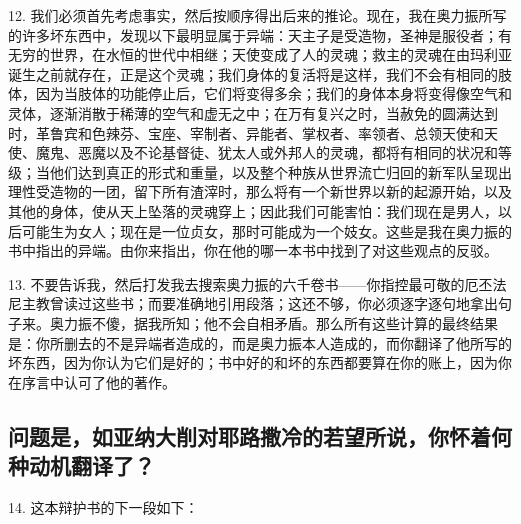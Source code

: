 12. 我们必须首先考虑事实，然后按顺序得出后来的推论。现在，我在奥力振所写的许多坏东西中，发现以下最明显属于异端：天主子是受造物，圣神是服役者；有无穷的世界，在水恒的世代中相继；天使变成了人的灵魂；救主的灵魂在由玛利亚诞生之前就存在，正是这个灵魂；我们身体的复活将是这样，我们不会有相同的肢体，因为当肢体的功能停止后，它们将变得多余；我们的身体本身将变得像空气和灵体，逐渐消散于稀薄的空气和虚无之中；在万有复兴之时，当赦免的圆满达到时，革鲁宾和色辣芬、宝座、宰制者、异能者、掌权者、率领者、总领天使和天使、魔鬼、恶魔以及不论基督徒、犹太人或外邦人的灵魂，都将有相同的状况和等级；当他们达到真正的形式和重量，以及整个种族从世界流亡归回的新军队呈现出理性受造物的一团，留下所有渣滓时，那么将有一个新世界以新的起源开始，以及其他的身体，使从天上坠落的灵魂穿上；因此我们可能害怕：我们现在是男人，以后可能生为女人；现在是一位贞女，那时可能成为一个妓女。这些是我在奥力振的书中指出的异端。由你来指出，你在他的哪一本书中找到了对这些观点的反驳。\par

13. 不要告诉我，然后打发我去搜索奥力振的六千卷书——你指控最可敬的厄丕法尼主教曾读过这些书；而要准确地引用段落；这还不够，你必须逐字逐句地拿出句子来。奥力振不傻，据我所知；他不会自相矛盾。那么所有这些计算的最终结果是：你所删去的不是异端者造成的，而是奥力振本人造成的，而你翻译了他所写的坏东西，因为你认为它们是好的；书中好的和坏的东西都要算在你的账上，因为你在序言中认可了他的著作。\par


\subsection{问题是，如亚纳大削对耶路撒冷的若望所说，你怀着何种动机翻译了？}

14. 这本辩护书的下一段如下：\par

\par

